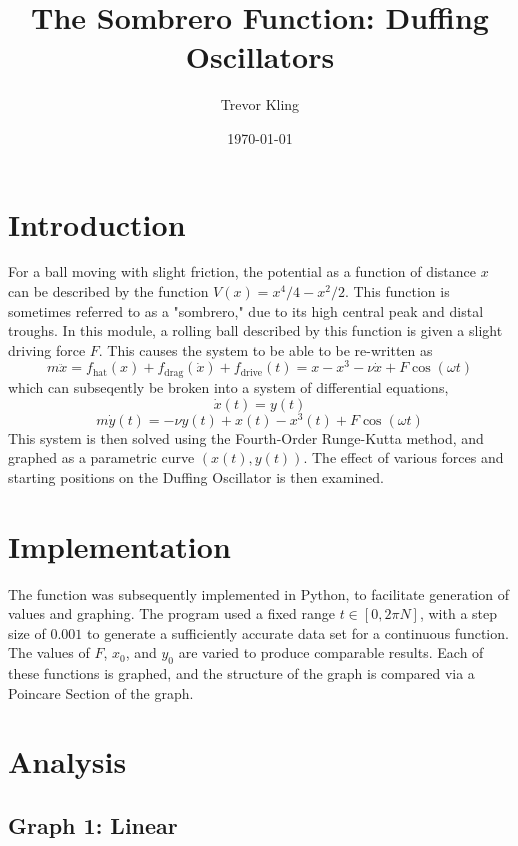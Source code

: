 \documentclass[aps,pra,notitlepage,amsmath,amssymb,letterpaper,12pt]{revtex4-1}
\begin{document}
 
\title{The Sombrero Function: Duffing Oscillators}
\author{Trevor Kling}
\date{\today}

\maketitle

\section{Introduction}

For a ball moving with slight friction, the potential as a function of distance $x$ can be described by the function $V(x) = x^4/4 - x^2/2$.  This function is sometimes referred to as a "sombrero," due to its high central peak and distal troughs. In this module, a rolling ball described by this function is given a slight driving force $F$.  This causes the system to be able to be re-written as
$$m\ddot{x} = f_{\text{hat}}(x) + f_{\text{drag}}(\dot{x}) + f_{\text{drive}}(t) = x - x^3 - \nu \dot{x} + F\cos(\omega t)$$
which can subseqently be broken into a system of differential equations,
$$\dot{x}(t) = y(t)$$
$$m\dot{y}(t) = -\nu y(t) + x(t) - x^3(t) + F\cos(\omega t)$$
This system is then solved using the Fourth-Order Runge-Kutta method, and graphed as a parametric curve $(x(t), y(t))$.  The effect of various forces and starting positions on the Duffing Oscillator is then examined.

\section{Implementation}

The function was subsequently implemented in Python, to facilitate generation of values and graphing.  The program used a fixed range $t \in [0,2\pi N]$, with a step size of $0.001$ to generate a sufficiently accurate data set for a continuous function.  The values of $F$, $x_0$, and $y_0$ are varied to produce comparable results.  Each of these functions is graphed, and the structure of the graph is compared via a Poincare Section of the graph.

\section{Analysis}
\subsection{Graph 1: Linear}
\end{document}
